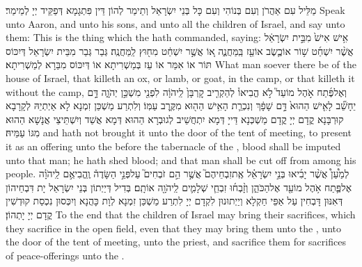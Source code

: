 {מַלֵּיל עִם אַהֲרֹן וְעִם בְּנוֹהִי וְעִם כָּל בְּנֵי יִשְׂרָאֵל וְתֵימַר לְהוֹן דֵּין פִּתְגָמָא דְּפַקֵּיד יְיָ לְמֵימַר׃}
{Speak unto Aaron, and unto his sons, and unto all the children of Israel, and say unto them: This is the thing which the \lord\space hath commanded, saying:}{}
{אִ֥ישׁ אִישׁ֙ מִבֵּ֣ית יִשְׂרָאֵ֔ל אֲשֶׁ֨ר יִשְׁחַ֜ט שׁ֥וֹר אוֹ\maqqaf כֶ֛שֶׂב אוֹ\maqqaf עֵ֖ז בַּֽמַּחֲנֶ֑ה א֚וֹ אֲשֶׁ֣ר יִשְׁחַ֔ט מִח֖וּץ לַֽמַּחֲנֶֽה׃}
{גְּבַר גְּבַר מִבֵּית יִשְׂרָאֵל דְּיִכּוֹס תּוֹר אוֹ אִמַּר אוֹ עֵז בְּמַשְׁרִיתָא אוֹ דְּיִכּוֹס מִבַּרָא לְמַשְׁרִיתָא׃}
{What man soever there be of the house of Israel, that killeth an ox, or lamb, or goat, in the camp, or that killeth it without the camp,}{}
{וְאֶל\maqqaf פֶּ֜תַח אֹ֣הֶל מוֹעֵד֮ לֹ֣א הֱבִיאוֹ֒ לְהַקְרִ֤יב קׇרְבָּן֙ לַֽיהֹוָ֔ה לִפְנֵ֖י מִשְׁכַּ֣ן יְהֹוָ֑ה דָּ֣ם יֵחָשֵׁ֞ב לָאִ֤ישׁ הַהוּא֙ דָּ֣ם שָׁפָ֔ךְ וְנִכְרַ֛ת הָאִ֥ישׁ הַה֖וּא מִקֶּ֥רֶב עַמּֽוֹ׃}
{וְלִתְרַע מַשְׁכַּן זִמְנָא לָא אַיְתְיֵהּ לְקָרָבָא קוּרְבָּנָא קֳדָם יְיָ קֳדָם מַשְׁכְּנָא דַּייָ דְּמָא יִתְחֲשֵׁיב לְגוּבְרָא הַהוּא דְּמָא אֲשַׁד וְיִשְׁתֵּיצֵי אֲנָשָׁא הַהוּא מִגּוֹ עַמֵּיהּ׃}
{and hath not brought it unto the door of the tent of meeting, to present it as an offering unto the \lord\space before the tabernacle of the \lord, blood shall be imputed unto that man; he hath shed blood; and that man shall be cut off from among his people.}{}
{לְמַ֩עַן֩ אֲשֶׁ֨ר יָבִ֜יאוּ בְּנֵ֣י יִשְׂרָאֵ֗ל אֶֽת\maqqaf זִבְחֵיהֶם֮ אֲשֶׁ֣ר הֵ֣ם זֹבְחִים֮ עַל\maqqaf פְּנֵ֣י הַשָּׂדֶה֒ וֶֽהֱבִיאֻ֣ם לַֽיהֹוָ֗ה אֶל\maqqaf פֶּ֛תַח אֹ֥הֶל מוֹעֵ֖ד אֶל\maqqaf הַכֹּהֵ֑ן וְזָ֨בְח֜וּ זִבְחֵ֧י שְׁלָמִ֛ים לַֽיהֹוָ֖ה אוֹתָֽם׃}
{בְּדִיל דְּיַיְתוֹן בְּנֵי יִשְׂרָאֵל יָת דִּבְחֵיהוֹן דְּאִנּוּן דָּבְחִין עַל אַפֵּי חַקְלָא וְיַיְתוּנוּן לִקְדָם יְיָ לִתְרַע מַשְׁכַּן זִמְנָא לְוָת כָּהֲנָא וְיִכְּסוּן נִכְסַת קוּדְשִׁין קֳדָם יְיָ יָתְהוֹן׃}
{To the end that the children of Israel may bring their sacrifices, which they sacrifice in the open field, even that they may bring them unto the \lord, unto the door of the tent of meeting, unto the priest, and sacrifice them for sacrifices of peace-offerings unto the \lord.}{}
